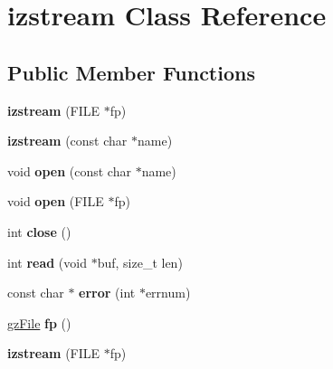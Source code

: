 \hypertarget{classizstream}{}\section{izstream Class Reference}
\label{classizstream}
\subsection*{Public Member Functions}
\begin{DoxyCompactItemize}
\item 
\mbox{\label{classizstream_a9f958c2eef83729ec6dda0b800e48273}} 
{\bfseries izstream} (F\+I\+LE $\ast$fp)
\item 
\mbox{\label{classizstream_a30fb60b38cda7232e23b199c00e72412}} 
{\bfseries izstream} (const char $\ast$name)
\item 
\mbox{\label{classizstream_a3e0af69bbc4704daa637850817b77098}} 
void {\bfseries open} (const char $\ast$name)
\item 
\mbox{\label{classizstream_a1ddcaff781f58a08576f0935be5ccd3c}} 
void {\bfseries open} (F\+I\+LE $\ast$fp)
\item 
\mbox{\label{classizstream_ac2a7342deb79761277e846c8b24ef92a}} 
int {\bfseries close} ()
\item 
\mbox{\label{classizstream_a6e280a19c4a745ab4acc9615788ffa95}} 
int {\bfseries read} (void $\ast$buf, size\+\_\+t len)
\item 
\mbox{\label{classizstream_a19ca9a17f897366d081aae3950f7946e}} 
const char $\ast$ {\bfseries error} (int $\ast$errnum)
\item 
\mbox{\label{classizstream_a0438da66cc9cdb1a2a7ab4872a909fbf}} 
\hyperlink{structgz_file__s}{gz\+File} {\bfseries fp} ()
\item 
\mbox{\label{classizstream_a9f958c2eef83729ec6dda0b800e48273}} 
{\bfseries izstream} (F\+I\+LE $\ast$fp)
\item 
\mbox{\label{classizstream_a30fb60b38cda7232e23b199c00e72412}} 

\end{DoxyCompactItemize}
